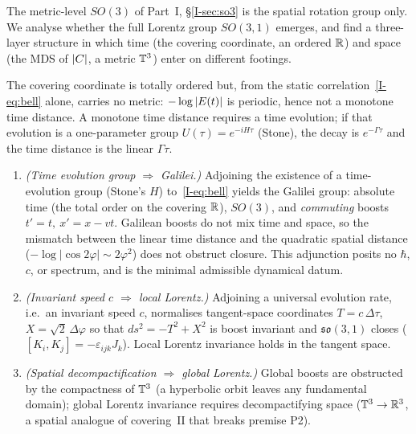\documentclass[11pt]{article}
\begin{document}
The metric-level $SO(3)$ of Part~I, \S\ref{I-sec:so3} is the spatial rotation group only.
We analyse whether the full Lorentz group $SO(3,1)$ emerges, and find a three-layer
structure in which time (the covering coordinate, an ordered $\mathbb{R}$) and space (the MDS of
$|C|$, a metric $\mathbb{T}^3$) enter on different footings.

\begin{proposition}\label{prop:no-time-metric}
The covering coordinate is totally ordered but, from the static correlation~\eqref{I-eq:bell}
alone, carries no metric: $-\log|E(t)|$ is periodic, hence not a monotone time
distance. A monotone time distance requires a time evolution; if that evolution is a
one-parameter group $U(\tau)=e^{-iH\tau}$ (Stone), the decay is $e^{-\Gamma\tau}$ and the
time distance is the linear $\Gamma\tau$.
\end{proposition}

\begin{theorem}\label{thm:lorentz}
\begin{enumerate}
\item[\rm(L1)] \emph{(Time evolution group $\Rightarrow$ Galilei.)} Adjoining the existence
of a time-evolution group (Stone's $H$) to~\eqref{I-eq:bell} yields the Galilei group:
absolute time (the total order on the covering $\mathbb{R}$), $SO(3)$, and \emph{commuting}
boosts $t'=t,\ x'=x-vt$. Galilean boosts do not mix time and space, so the mismatch
between the linear time distance and the quadratic spatial distance
($-\log|\cos2\varphi|\sim2\varphi^2$) does not obstruct closure. This adjunction posits no
$\hbar$, $c$, or spectrum, and is the minimal admissible dynamical datum.
\item[\rm(L2)] \emph{(Invariant speed $c$ $\Rightarrow$ local Lorentz.)} Adjoining a
universal evolution rate, i.e.\ an invariant speed $c$, normalises tangent-space
coordinates $T=c\,\Delta\tau$, $X=\sqrt2\,\Delta\varphi$ so that $ds^2=-T^2+X^2$ is boost
invariant and $\mathfrak{so}(3,1)$ closes ($[K_i,K_j]=-\varepsilon_{ijk}J_k$). Local
Lorentz invariance holds in the tangent space.
\item[\rm(L3)] \emph{(Spatial decompactification $\Rightarrow$ global Lorentz.)} Global
boosts are obstructed by the compactness of $\mathbb{T}^3$ (a hyperbolic orbit leaves any
fundamental domain); global Lorentz invariance requires decompactifying space
($\mathbb{T}^3\to\mathbb{R}^3$, a spatial analogue of covering~II that breaks premise P2).
\end{enumerate}
\end{theorem}
\end{document}
